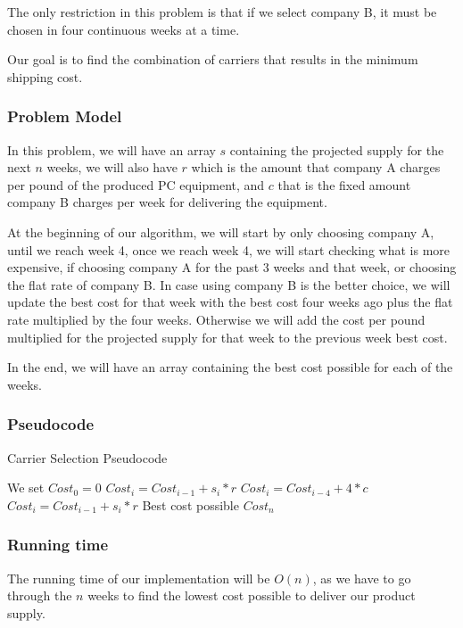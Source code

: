\documentclass{article}
\begin{document}
The only restriction in this problem is that if we select company B, it must be chosen in four continuous weeks at a time.

Our goal is to find the combination of carriers that results in the minimum shipping cost.

\subsubsection*{Problem Model}

In this problem, we will have an array $s$ containing the projected supply for the next $n$ weeks, we will also have $r$ which is the amount that company A charges per pound of the produced PC equipment, and $c$ that is the fixed amount company B charges per week for delivering the equipment.

At the beginning of our algorithm, we will start by only choosing company A, until we reach week 4, once we reach week 4, we will start checking  what is more expensive, if choosing company A for the past 3 weeks and that week, or choosing the flat rate of company B. In case using company B is the better choice, we will update the best cost for that week with the best cost four weeks ago plus the flat rate multiplied by the four weeks. Otherwise we will add the cost per pound multiplied for the projected supply for that week to the previous week best cost.

In the end, we will have an array containing the best cost possible for each of the weeks.

\subsubsection*{Pseudocode}

\begin{algorithm}[H]
\caption{Carrier Selection Pseudocode}
\begin{algorithmic}[1]
\State We set $Cost_0 = 0$
  \State $Cost_i = Cost_{i-1}+s_i*r$
 \Else
   \State $Cost_i = Cost_{i-4}+4*c$
  \Else
   \State $Cost_i = Cost_{i-1}+s_i*r$
  \EndIf
 \EndIf
\EndFor
\State \Return Best cost possible $Cost_n$
\end{algorithmic}
\end{algorithm}

\subsubsection*{Running time}

The running time of our implementation will be $O(n)$, as we have to go through the $n$ weeks to find the lowest cost possible to deliver our product supply.
\end{document}
